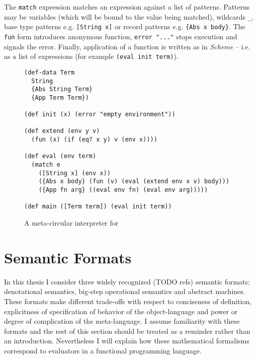 The \lstinline!match! expression matches an expression against a list of patterns.
Patterns may be variables (which will be bound to the value being matched), wildcards \lstinline!_!, base type patterns e.g. \lstinline![String x]! or record patterns e.g. \lstinline!{Abs x body}!.
The \lstinline!fun! form introduces anonymous function, \lstinline!error "..."! stops execution and signals the error.
Finally, application of a function is written as in \textit{Scheme} -- i.e. as a list of expressions (for example \lstinline!(eval init term)!).

\begin{figure}
    \centering
    \begin{lstlisting}
(def-data Term
  String
  {Abs String Term}
  {App Term Term})

(def init (x) (error "empty environment"))

(def extend (env y v)
  (fun (x) (if (eq? x y) v (env x))))

(def eval (env term)
  (match e
    ([String x] (env x))
    ({Abs x body} (fun (v) (eval (extend env x v) body)))
    ({App fn arg} ((eval env fn) (eval env arg)))))
        
(def main ([Term term]) (eval init term))
    \end{lstlisting}
    \caption{A meta-circular interpreter for \LC{}}
    \label{fig:lambda-calc-interp}
\end{figure}

\section{Semantic Formats}
In this thesis I consider three widely recognized (TODO refs) semantic formats: denotational semantics, big-step operational semantics and abstract machines.
These formats make different trade-offs with respect to conciseness of definition, explicitness of specification of behavior of the object-language and power or degree of complication of the meta-language.
I assume familiarity with these formats and the rest of this section should be treated as a reminder rather than an introduction.
Nevertheless I will explain how these mathematical formalisms correspond to evaluators in a functional programming language.

